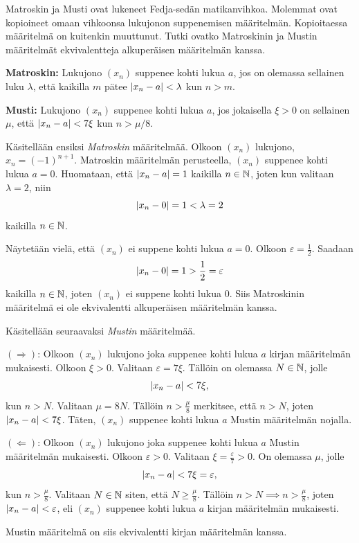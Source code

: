 \documentclass[11pt,a4paper]{amsart}
\begin{document}
\begin{exercise}
Matroskin ja Musti ovat lukeneet Fedja-sedän matikanvihkoa. Molemmat ovat
kopioineet omaan vihkoonsa lukujonon suppenemisen määritelmän. Kopioitaessa
määritelmä on kuitenkin muuttunut. Tutki ovatko Matroskinin ja Mustin
määritelmät ekvivalentteja alkuperäisen määritelmän kanssa.

\textbf{Matroskin:} Lukujono $(x_n)$ suppenee kohti lukua $a$, jos on
olemassa sellainen luku $\lambda$, että kaikilla $m$ pätee
$\lvert x_n-a\rvert<\lambda$ kun $n>m$.

\textbf{Musti:} Lukujono $(x_n)$ suppenee kohti lukua $a$, jos jokaisella
$\xi>0$ on sellainen $\mu$, että $\lvert x_n-a\rvert<7\xi$ kun $n>\mu/8$.
\end{exercise}

\begin{solution}
Käsitellään ensiksi \emph{Matroskin} määritelmää. Olkoon \((x_n)\) lukujono,
\(x_n = (-1)^{n + 1}\). Matroskin määritelmän perusteella, \((x_n)\) suppenee
kohti lukua \(a = 0\). Huomataan, että \(\lvert x_n - a\rvert = 1\) kaikilla
\(n \in \mathbb{N}\), joten kun valitaan \(\lambda = 2\), niin
\[
\lvert x_n - 0\rvert = 1 < \lambda = 2
\]
kaikilla \(n \in \mathbb{N}\).

Näytetään vielä, että \((x_n)\) ei suppene kohti lukua \(a = 0\). Olkoon
\(\varepsilon = \frac{1}{2}\). Saadaan
\[
\lvert x_n - 0\rvert = 1 > \frac{1}{2} = \varepsilon
\]
kaikilla \(n \in \mathbb{N}\), joten \((x_n)\) ei suppene kohti lukua \(0\).
Siis Matroskinin määritelmä ei ole ekvivalentti alkuperäisen määritelmän kanssa.

Käsitellään seuraavaksi \emph{Mustin} määritelmää.

\((\Rightarrow)\): Olkoon \((x_n)\) lukujono joka suppenee kohti lukua \(a\)
kirjan määritelmän mukaisesti. Olkoon \(\xi > 0\). Valitaan \(\varepsilon = 7\xi\).
Tällöin on olemassa \(N \in \mathbb{N}\), jolle
\[
\lvert x_n - a\rvert < 7\xi,
\]
kun \(n > N\). Valitaan \(\mu = 8N\). Tällöin \(n > \frac{\mu}{8}\) merkitsee,
että \(n > N\), joten \(\lvert x_n - a\rvert < 7\xi\). Täten, \((x_n)\) suppenee
kohti lukua \(a\) Mustin määritelmän nojalla.

\((\Leftarrow)\): Olkoon \((x_n)\) lukujono joka suppenee kohti lukua \(a\)
Mustin määritelmän mukaisesti. Olkoon \(\varepsilon > 0\). Valitaan
\(\xi = \frac{\varepsilon}{7} > 0\). On olemassa \(\mu\), jolle
\[
\lvert x_n - a\rvert < 7\xi = \varepsilon,
\]
kun \(n > \frac{\mu}{8}\). Valitaan \(N \in \mathbb{N}\) siten, että
\(N \geq \frac{\mu}{8}\). Tällöin \(n > N \implies n > \frac{\mu}{8}\), joten
\(\lvert x_n - a\rvert < \varepsilon\), eli \((x_n)\) suppenee kohti lukua \(a\) kirjan
määritelmän mukaisesti.

Mustin määritelmä on siis ekvivalentti kirjan määritelmän kanssa.
\end{solution}
\end{document}
